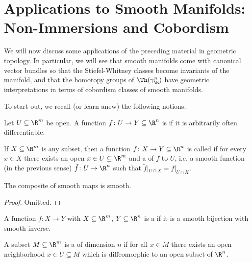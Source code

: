 \section[Applications to Smooth Manifolds]{Applications to Smooth Manifolds: Non-Immersions and Cobordism}
We will now discuss some applications of the preceding material in geometric topology.
In particular, we will see that smooth manifolds come with canonical vector bundles so that the Stiefel-Whitney classes become invariants of the manifold, and that the homotopy groups of $\Th(\gamma_\R^n)$ have geometric interpretations in terms of cobordism classes of smooth manifolds.

To start out, we recall (or learn anew) the following notions:
\begin{definition}
	Let $U \subseteq \R^m$ be open.
	A function $f\colon U \to Y \subseteq \R^n$ is  if it is arbitrarily often differentiable.

	If $X \subseteq \R^m$ is any subset, then a function $f\colon X \to Y \subseteq \R^n$ is called  if for every $x \in X$ there exists an open $x \in U \subseteq \R^m$ and a  of $f$ to $U$, i.e. a smooth function (in the previous sense) $\tilde{f}\colon U \to \R^n$ such that $\tilde{f}|_{U \cap X} = f|_{U \cap X}$.
\end{definition}
\begin{lemma}
	The composite of smooth maps is smooth.
\end{lemma}
\begin{proof}
	Omitted.
\end{proof}
\begin{definition}
	A function $f\colon X \to Y$ with $X \subseteq \R^m$, $Y \subseteq \R^n$ is a  if it is a smooth bijection with smooth inverse. 
	
	A subset $M \subseteq \R^m$ is a  of dimension $n$ if for all $x \in M$ there exists an open neighborhood $x \in U \subseteq M$ which is diffeomorphic to an open subset of $\R^n$.
\end{definition}
